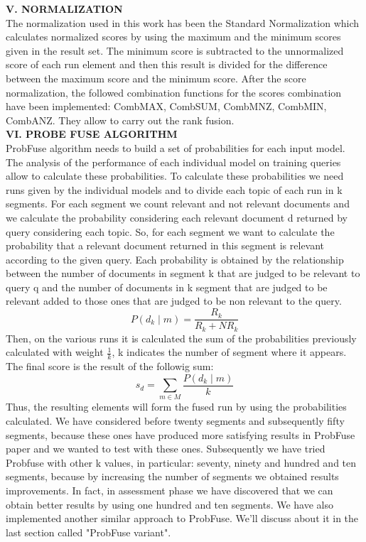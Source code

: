 \documentclass[12pt,journal]{IEEEtran}
\begin{document}
\textbf{V. NORMALIZATION} \\
The normalization used in this work has been the Standard Normalization which calculates normalized scores by using the maximum and the minimum scores given in the result set. 
The minimum score is subtracted to the unnormalized score of each run element and then this result is divided for the difference between the maximum score and the minimum score.
After the score normalization, the followed combination functions for the scores combination have been implemented: CombMAX, CombSUM, CombMNZ, CombMIN, CombANZ.
They allow to carry out the rank fusion. \\

\textbf{VI.	PROBE FUSE ALGORITHM} \\
ProbFuse algorithm needs to build a set of probabilities for each input model. 
The analysis of the performance of each individual model on training queries allow to calculate these probabilities. 
To calculate these probabilities we need runs given by the individual models and to divide each topic of each run in k segments. For each segment we count relevant and not relevant documents and we calculate the probability considering each relevant document d returned by query considering each topic. 
So, for each segment we want to calculate the probability that a relevant document returned in this segment is relevant according to the given query. Each probability is obtained by the relationship between the number of documents in segment k that are judged to be relevant to query q and the number of documents in k segment that are judged to be relevant added to those ones that are judged to be non relevant to the query.
\[P(d_k\mid m)=\frac{R_k}{R_k+NR_k}\]
Then, on the various runs it is calculated the sum of the probabilities previously calculated with weight  $\frac{1}{k}$, k indicates the number of segment where it appears.
The final score is the result of the followig sum:
\[s_d=\sum_{m\in M}\frac{P(d_k\mid m)}{k}\]
Thus, the resulting elements will form the fused run by using the probabilities calculated. 
We have considered before twenty segments and subsequently fifty segments, because these ones have produced more satisfying results in ProbFuse paper and we wanted to test with these ones. Subsequently we have tried Probfuse with other k values, in particular: seventy, ninety and hundred and ten segments, because by increasing the number of segments we obtained results improvements. In fact, in assessment phase we have discovered that we can obtain better results by using one hundred and ten segments. We have also implemented another similar approach to ProbFuse. We'll discuss about it in the last section called "ProbFuse variant". \\
\end{document}
